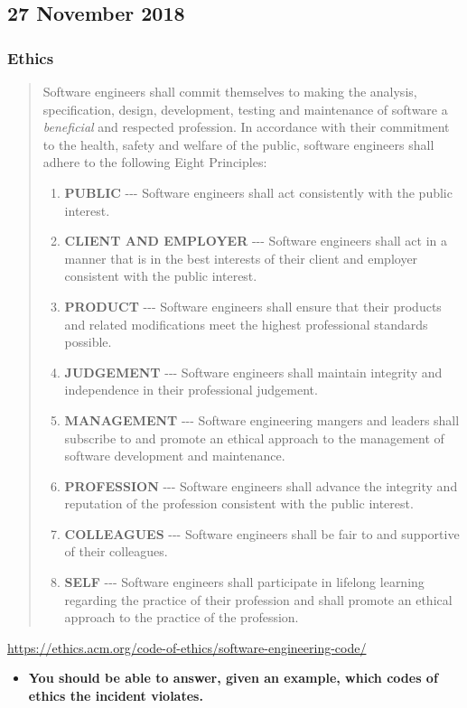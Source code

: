 \documentclass[a4paper]{article}
\providecommand{\tightlist}{%
  \setlength{\itemsep}{0pt}\setlength{\parskip}{0pt}}
\begin{document}
\hypertarget{27-november-2018}{%
\subsection{27 November 2018}\label{27-november-2018}}

\hypertarget{ethics}{%
\subsubsection{Ethics}\label{ethics}}

\begin{quote}
Software engineers shall commit themselves to making the analysis,
specification, design, development, testing and maintenance of software
a \emph{beneficial} and respected profession. In accordance with their
commitment to the health, safety and welfare of the public, software
engineers shall adhere to the following Eight Principles:

\begin{enumerate}
\def\labelenumi{\arabic{enumi}.}
\tightlist
\item
  \textbf{PUBLIC} -\/-\/- Software engineers shall act consistently with
  the public interest.
\item
  \textbf{CLIENT AND EMPLOYER} -\/-\/- Software engineers shall act in a
  manner that is in the best interests of their client and employer
  consistent with the public interest.
\item
  \textbf{PRODUCT} -\/-\/- Software engineers shall ensure that their
  products and related modifications meet the highest professional
  standards possible.
\item
  \textbf{JUDGEMENT} -\/-\/- Software engineers shall maintain integrity
  and independence in their professional judgement.
\item
  \textbf{MANAGEMENT} -\/-\/- Software engineering mangers and leaders
  shall subscribe to and promote an ethical approach to the management
  of software development and maintenance.
\item
  \textbf{PROFESSION} -\/-\/- Software engineers shall advance the
  integrity and reputation of the profession consistent with the public
  interest.
\item
  \textbf{COLLEAGUES} -\/-\/- Software engineers shall be fair to and
  supportive of their colleagues.
\item
  \textbf{SELF} -\/-\/- Software engineers shall participate in lifelong
  learning regarding the practice of their profession and shall promote
  an ethical approach to the practice of the profession.
\end{enumerate}
\end{quote}

\href{https://ethics.acm.org/code-of-ethics/software-engineering-code/}{https://ethics.acm.org/code-of-ethics/software-engineering-code/}

\begin{itemize}
\tightlist
\item
  \textbf{You should be able to answer, given an example, which codes of
  ethics the incident violates.}
\end{itemize}
\end{document}
